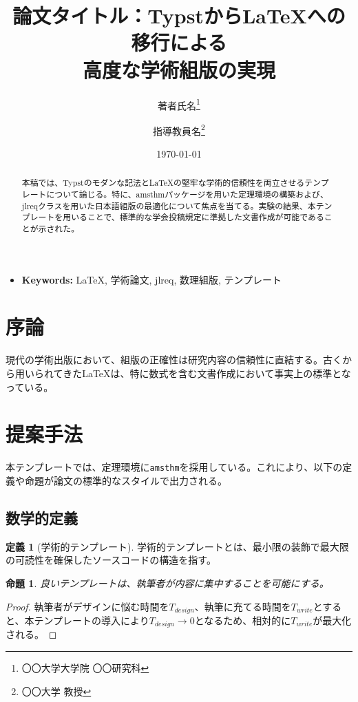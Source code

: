 \documentclass[
  paper=a4,
  fontsize=10.5pt,
  twocolumn,
  column_gap=2zw,
  number_of_lines=40,
  line_length=45zw
]{jlreq}
\title{論文タイトル：TypstからLaTeXへの移行による\\高度な学術組版の実現}
\author{著者氏名\thanks{〇〇大学大学院 〇〇研究科} \and 指導教員名\thanks{〇〇大学 教授}}
\date{\today}
\theoremstyle{definition}
\newtheorem{definition}{定義}[section]
\theoremstyle{plain}
\newtheorem{proposition}[theorem]{命題}
\theoremstyle{remark}
\begin{document}
\maketitle

\begin{abstract}
本稿では、Typstのモダンな記法とLaTeXの堅牢な学術的信頼性を両立させるテンプレートについて論じる。特に、amsthmパッケージを用いた定理環境の構築および、jlreqクラスを用いた日本語組版の最適化について焦点を当てる。実験の結果、本テンプレートを用いることで、標準的な学会投稿規定に準拠した文書作成が可能であることが示された。
\end{abstract}

\begin{itemize}[label={}]
    \item \textbf{Keywords:} LaTeX, 学術論文, jlreq, 数理組版, テンプレート
\end{itemize}

\section{序論}
現代の学術出版において、組版の正確性は研究内容の信頼性に直結する。古くから用いられてきた\LaTeX{}は、特に数式を含む文書作成において事実上の標準となっている。

\section{提案手法}
本テンプレートでは、定理環境に\texttt{amsthm}を採用している。これにより、以下の定義や命題が論文の標準的なスタイルで出力される。

\subsection{数学的定義}
\begin{definition}[学術的テンプレート]
学術的テンプレートとは、最小限の装飾で最大限の可読性を確保したソースコードの構造を指す。
\end{definition}

\begin{proposition}
良いテンプレートは、執筆者が内容に集中することを可能にする。
\end{proposition}

\begin{proof}
執筆者がデザインに悩む時間を$T_{design}$、執筆に充てる時間を$T_{write}$とすると、本テンプレートの導入により$T_{design} \to 0$となるため、相対的に$T_{write}$が最大化される。
\end{proof}
\end{document}
